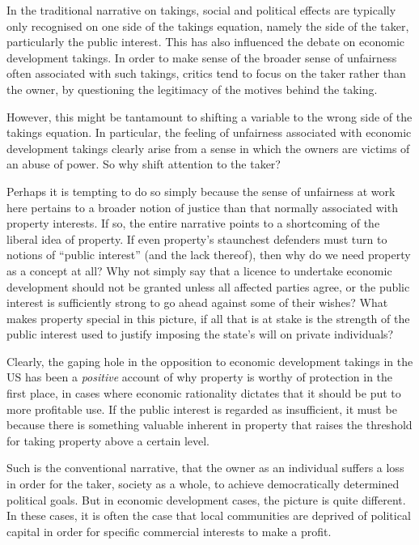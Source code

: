 In the traditional narrative on takings, social and political effects are typically only recognised on one side of the takings equation, namely the side of the taker, particularly the public interest. This has also influenced the debate on economic development takings. In order to make sense of the broader sense of unfairness often associated with such takings, critics tend to focus on the taker rather than the owner, by questioning the legitimacy of the motives behind the taking.

However, this might be tantamount to shifting a variable to the wrong side of the takings equation. In particular, the feeling of unfairness associated with economic development takings clearly arise from a sense in which the owners are victims of an abuse of power. So why shift attention to the taker? 

Perhaps it is tempting to do so simply because the sense of unfairness at work here pertains to a broader notion of justice than that normally associated with property interests. If so, the entire narrative points to a shortcoming of the liberal idea of property. If even property's staunchest defenders must turn to notions of ``public interest'' (and the lack thereof), then why do we need property as a concept at all? Why not simply say that a licence to undertake economic development should not be granted unless all affected parties agree, or the public interest is sufficiently strong to go ahead against some of their wishes? What makes property special in this picture, if all that is at stake is the strength of the public interest used to justify imposing the state's will on private individuals?

Clearly, the gaping hole in the opposition to economic development takings in the US has been a {\it positive} account of why property is worthy of protection in the first place, in cases where economic rationality dictates that it should be put to more profitable use. If the public interest is regarded as insufficient, it must be because there is something valuable inherent in property that raises the threshold for taking property above a certain level.

Such is the conventional narrative, that the owner as an individual suffers a loss in order for the taker, society as a whole, to achieve democratically determined political goals. But in economic development cases, the picture is quite different. In these cases, it is often the case that local communities are deprived of political capital in order for specific commercial interests to make a profit. 

